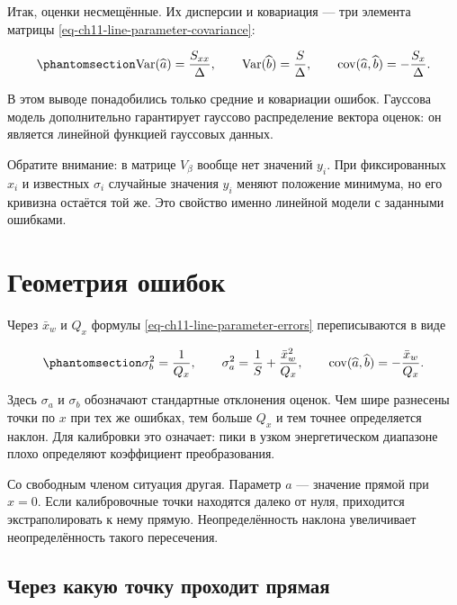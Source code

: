 \documentclass[
  russian,
  11pt,
  a4paper,
  open=any]{scrbook}
\begin{document}
Итак, оценки несмещённые. Их дисперсии и ковариация --- три элемента
матрицы \ref{eq-ch11-line-parameter-covariance}:

\begin{equation}\protect\phantomsection\label{eq-ch11-line-parameter-errors}{
\operatorname{Var}(\widehat a)=\frac{S_{xx}}\Delta,
\qquad
\operatorname{Var}(\widehat b)=\frac{S}\Delta,
\qquad
\operatorname{cov}(\widehat a,\widehat b)=-\frac{S_x}\Delta.
}\end{equation}

В этом выводе понадобились только средние и ковариации ошибок. Гауссова
модель дополнительно гарантирует гауссово распределение вектора оценок:
он является линейной функцией гауссовых данных.

Обратите внимание: в матрице \(V_\beta\) вообще нет значений \(y_i\).
При фиксированных \(x_i\) и известных \(\sigma_i\) случайные значения
\(y_i\) меняют положение минимума, но его кривизна остаётся той же. Это
свойство именно линейной модели с заданными ошибками.

\section{Геометрия
ошибок}\label{ux433ux435ux43eux43cux435ux442ux440ux438ux44f-ux43eux448ux438ux431ux43eux43a}

Через \(\bar x_w\) и \(Q_x\) формулы \ref{eq-ch11-line-parameter-errors}
переписываются в виде

\begin{equation}\protect\phantomsection\label{eq-ch11-errors-from-coordinate-spread}{
\sigma_b^2=\frac1{Q_x},
\qquad
\sigma_a^2=\frac1S+\frac{\bar x_w^2}{Q_x},
\qquad
\operatorname{cov}(\widehat a,\widehat b)=-\frac{\bar x_w}{Q_x}.
}\end{equation}

Здесь \(\sigma_a\) и \(\sigma_b\) обозначают стандартные отклонения
оценок. Чем шире разнесены точки по \(x\) при тех же ошибках, тем больше
\(Q_x\) и тем точнее определяется наклон. Для калибровки это означает:
пики в узком энергетическом диапазоне плохо определяют коэффициент
преобразования.

Со свободным членом ситуация другая. Параметр \(a\) --- значение прямой
при \(x=0\). Если калибровочные точки находятся далеко от нуля,
приходится экстраполировать к нему прямую. Неопределённость наклона
увеличивает неопределённость такого пересечения.

\subsection{Через какую точку проходит
прямая}\label{ux447ux435ux440ux435ux437-ux43aux430ux43aux443ux44e-ux442ux43eux447ux43aux443-ux43fux440ux43eux445ux43eux434ux438ux442-ux43fux440ux44fux43cux430ux44f}
\end{document}

